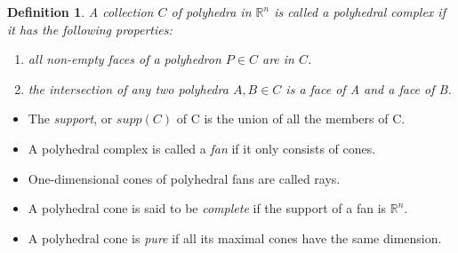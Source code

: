 \documentclass[12pt,a4paper]{report}
\newtheorem{definition}{Definition}
\begin{document}
\begin{definition}
A collection $C$ of polyhedra in $\mathbb R^n$ is called a \emph{polyhedral complex} if it has the following properties:
\begin{enumerate}
    \item all non-empty faces of a polyhedron $P \in C$ are in $C$.
    \item the intersection of any two polyhedra $A,B \in C$ is a face of A and a face of B.
\end{enumerate}
\end{definition}

\begin{itemize}
    \item The \emph{support}, or $supp(C)$ of C is the union of all the members of C. 
    \item A polyhedral complex is called a \emph{fan} if it only consists of cones. 
    \item One-dimensional cones of polyhedral fans are called rays.
    \item A polyhedral cone is said to be \emph{complete} if the support of a fan is $\mathbb R^n$.
    \item A polyhedral cone is \emph{pure} if all its maximal cones have the same dimension.
\end{itemize}
\end{document}
